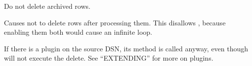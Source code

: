 \documentclass[letterpaper,10pt,english]{sphinxmanual}
\begin{document}

\begin{fulllineitems}
\label{\detokenize{mariadb-archiver:cmdoption-mariadb-archiver-no-delete}}
\sphinxAtStartPar
Do not delete archived rows.

\sphinxAtStartPar
Causes  not to delete rows after processing them.  This disallows
{\hyperref[\detokenize{mariadb-archiver:cmdoption-mariadb-archiver-no-ascend}]{}}, because enabling them both would cause an infinite loop.

\sphinxAtStartPar
If there is a plugin on the source DSN, its  method is called
anyway, even though  will not execute the delete.  See
“EXTENDING” for more on plugins.

\end{fulllineitems}

\end{document}

